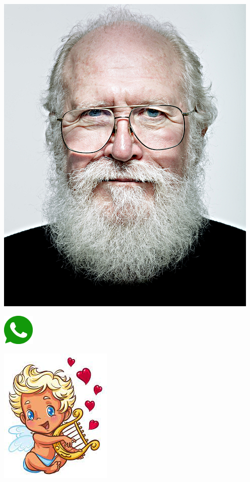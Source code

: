 \begin{multicols}{3}
			\begin{center}
				\includegraphics[height=.5\textheight]{./IMG-GIT/maddog.jpg}
			\end{center}
			\begin{flushright}
				\includegraphics[height=15mm]{./IMG-GIT/whatsapp.png}
			\end{flushright}
		\end{multicols}	
		
		\vfill
		\pagebreak
		
		\begin{center}
			\includegraphics[height=.7\textheight]{./IMG-GIT/anjo.jpg}
			
			
		\end{center}
		\vfill
		\pagebreak
		

